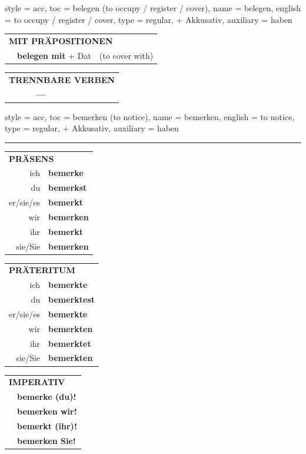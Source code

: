 \begin{verbentry}{
  style = {acc},
  toc = {belegen (to occupy / register / cover)},
  name = {belegen},
  english = {to occupy / register / cover},
  type = {regular, + Akkusativ},
  auxiliary = {haben}
}
\vspace{10pt}

\begin{tabular}{lll}
\multicolumn{3}{l}{\textbf{MIT PRÄPOSITIONEN}}\\
& \textbf{belegen mit} + Dat & (to cover with)\\
\end{tabular}
\hfill
\begin{tabular}{lll}
\multicolumn{3}{l}{\textbf{TRENNBARE VERBEN}}\\
& \textbf{---} & \\
\end{tabular}
\vspace{-5pt}
\end{verbentry}

\begin{verbentry}{
  style = {acc},
  toc = {bemerken (to notice)},
  name = {bemerken},
  english = {to notice},
  type = {regular, + Akkusativ},
  auxiliary = {haben}
}


\vspace{5pt}
\hrule
\vspace{5pt}

\begin{tabular}{rl}
\multicolumn{2}{l}{\textbf{PRÄSENS}}\\
ich & \textbf{bemerke}\\
du & \textbf{bemerkst}\\
er/sie/es & \textbf{bemerkt}\\
wir & \textbf{bemerken}\\
ihr & \textbf{bemerkt}\\
sie/Sie & \textbf{bemerken}\\
\end{tabular}
\hfill
\begin{tabular}{rl}
\multicolumn{2}{l}{\textbf{PRÄTERITUM}}\\
ich & \textbf{bemerkte}\\
du & \textbf{bemerktest}\\
er/sie/es & \textbf{bemerkte}\\
wir & \textbf{bemerkten}\\
ihr & \textbf{bemerktet}\\
sie/Sie & \textbf{bemerkten}\\
\end{tabular}
\hfill
\begin{tabular}{rl}
\multicolumn{2}{l}{\textbf{IMPERATIV}}\\
& \textbf{bemerke (du)!}\\
& \textbf{bemerken wir!}\\
& \textbf{bemerkt (ihr)!}\\
& \textbf{bemerken Sie!}\\
\end{tabular}


\end{verbentry}
